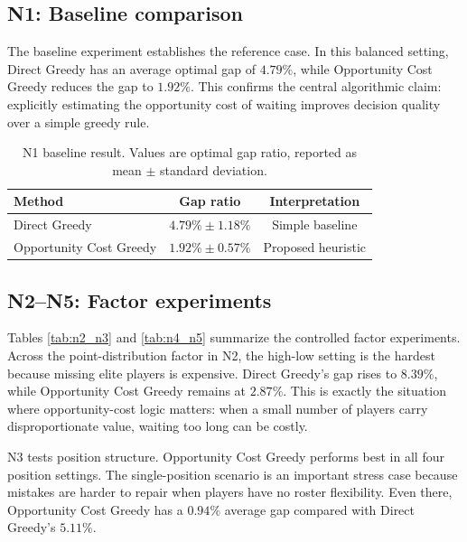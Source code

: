 \documentclass[10pt,a4paper]{article}
\begin{document}
\subsection{N1: Baseline comparison}

The baseline experiment establishes the reference case. In this balanced setting, Direct Greedy has an average optimal gap of $4.79\%$, while Opportunity Cost Greedy reduces the gap to $1.92\%$. This confirms the central algorithmic claim: explicitly estimating the opportunity cost of waiting improves decision quality over a simple greedy rule.

\begin{table}[H]
\centering
\small
\caption{N1 baseline result. Values are optimal gap ratio, reported as mean $\pm$ standard deviation.}
\label{tab:n1}
\begin{tabular}{lcc}
\toprule
Method & Gap ratio & Interpretation \\
\midrule
Direct Greedy & $4.79\% \pm 1.18\%$ & Simple baseline \\
Opportunity Cost Greedy & $1.92\% \pm 0.57\%$ & Proposed heuristic \\
\bottomrule
\end{tabular}
\end{table}

\subsection{N2--N5: Factor experiments}

Tables \ref{tab:n2_n3} and \ref{tab:n4_n5} summarize the controlled factor experiments. Across the point-distribution factor in N2, the high-low setting is the hardest because missing elite players is expensive. Direct Greedy's gap rises to $8.39\%$, while Opportunity Cost Greedy remains at $2.87\%$. This is exactly the situation where opportunity-cost logic matters: when a small number of players carry disproportionate value, waiting too long can be costly.

N3 tests position structure. Opportunity Cost Greedy performs best in all four position settings. The single-position scenario is an important stress case because mistakes are harder to repair when players have no roster flexibility. Even there, Opportunity Cost Greedy has a $0.94\%$ average gap compared with Direct Greedy's $5.11\%$.
\end{document}
